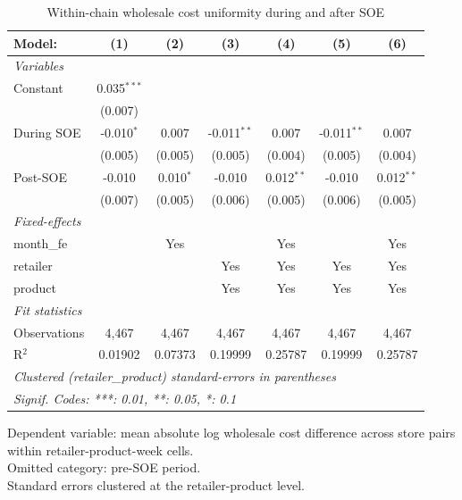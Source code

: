 
\begin{table}[htbp]
   \caption{\label{tab:uniformity_wholesale} Within-chain wholesale cost uniformity during and after SOE}
   \centering
   \begin{tabular}{lcccccc}
      \tabularnewline \midrule \midrule
      Model:       & (1)           & (2)         & (3)           & (4)          & (5)           & (6)\\  
      \midrule
      \emph{Variables}\\
      Constant     & 0.035$^{***}$ &             &               &              &               &   \\   
                   & (0.007)       &             &               &              &               &   \\   
      During SOE   & -0.010$^{*}$  & 0.007       & -0.011$^{**}$ & 0.007        & -0.011$^{**}$ & 0.007\\   
                   & (0.005)       & (0.005)     & (0.005)       & (0.004)      & (0.005)       & (0.004)\\   
      Post-SOE     & -0.010        & 0.010$^{*}$ & -0.010        & 0.012$^{**}$ & -0.010        & 0.012$^{**}$\\   
                   & (0.007)       & (0.005)     & (0.006)       & (0.005)      & (0.006)       & (0.005)\\   
      \midrule
      \emph{Fixed-effects}\\
      month\_fe    &               & Yes         &               & Yes          &               & Yes\\  
      retailer     &               &             & Yes           & Yes          & Yes           & Yes\\  
      product      &               &             & Yes           & Yes          & Yes           & Yes\\  
      \midrule
      \emph{Fit statistics}\\
      Observations & 4,467         & 4,467       & 4,467         & 4,467        & 4,467         & 4,467\\  
      R$^2$        & 0.01902       & 0.07373     & 0.19999       & 0.25787      & 0.19999       & 0.25787\\  
      \midrule \midrule
      \multicolumn{7}{l}{\emph{Clustered (retailer\_product) standard-errors in parentheses}}\\
      \multicolumn{7}{l}{\emph{Signif. Codes: ***: 0.01, **: 0.05, *: 0.1}}\\
   \end{tabular}
   
   \par \raggedright 
   Dependent variable: mean absolute log wholesale cost difference across store pairs within retailer-product-week cells.\\
   Omitted category: pre-SOE period.\\
   Standard errors clustered at the retailer-product level.
\end{table}


